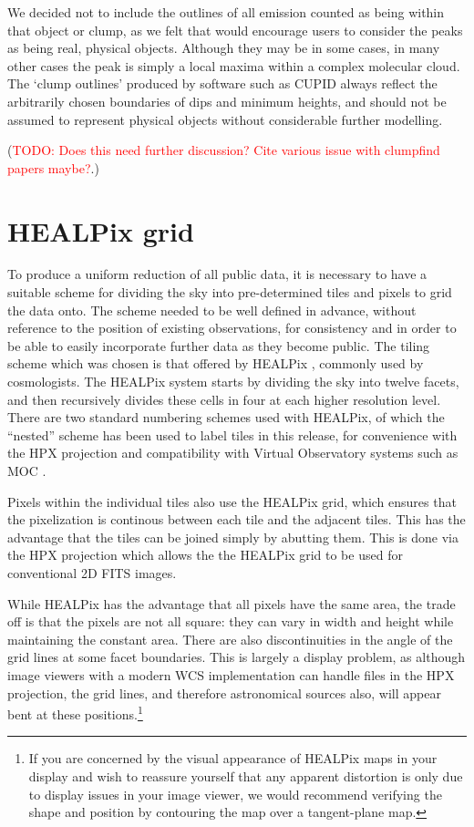 \documentclass[twocolumn,times]{aastex6}
\newcommand{\todo}[1]{\textcolor{red}{TODO: #1}}
\begin{document}
We decided not to include the outlines of all emission counted as
being within that object or clump, as we felt that would encourage
users to consider the peaks as being real, physical objects. Although
they may be in some cases, in many other cases the peak is simply a
local maxima within a complex molecular cloud. The `clump outlines'
produced by software such as CUPID always reflect the arbitrarily
chosen boundaries of dips and minimum heights, and should not be
assumed to represent physical objects without considerable further
modelling.

(\todo{Does this need further discussion? Cite various issue with clumpfind papers maybe?}.)


\section{HEALPix grid}
\label{sec:healpix}

To produce a uniform reduction of all public data, it is necessary to
have a suitable scheme for dividing the sky into pre-determined tiles
and pixels to grid the data onto.  The scheme needed to be well
defined in advance, without reference to the position of existing
observations, for consistency and in order to be able to easily
incorporate further data as they become public.  The tiling scheme
which was chosen is that offered by HEALPix \citep[Hierarchical Equal
Area isoLatitude Pixelization,][]{Gorski2005}, commonly used by
cosmologists. The HEALPix system starts by dividing the sky into
twelve facets, and then recursively divides these cells in four at each
higher resolution level.  There are two standard numbering schemes
used with HEALPix, of which the ``nested'' scheme has been used to
label tiles in this release, for convenience with the HPX projection
and compatibility with Virtual Observatory systems such as MOC
\citep[Multi-Order Coverage,][]{2013ASPC..475..135F}.

Pixels within the individual tiles also use the HEALPix grid, which
ensures that the pixelization is continous between each tile and the
adjacent tiles.  This has the advantage that the tiles can be joined
simply by abutting them.  This is done via the HPX projection
\citep{Calabretta2007} which allows the the HEALPix grid to be used
for conventional 2D FITS images.

While HEALPix has the advantage that all pixels have the same area,
the trade off is that the pixels are not all square: they can vary in
width and height while maintaining the constant area.  There are also
discontinuities in the angle of the grid lines at some facet
boundaries.  This is largely a display problem, as although image
viewers with a modern WCS implementation can handle files in the HPX
projection, the grid lines, and therefore astronomical sources also,
will appear bent at these positions.\footnote{If you are concerned by
  the visual appearance of HEALPix maps in your display and wish to
  reassure yourself that any apparent distortion is only due to
  display issues in your image viewer, we would recommend verifying
  the shape and position by contouring the map over a tangent-plane
  map.}
\end{document}
